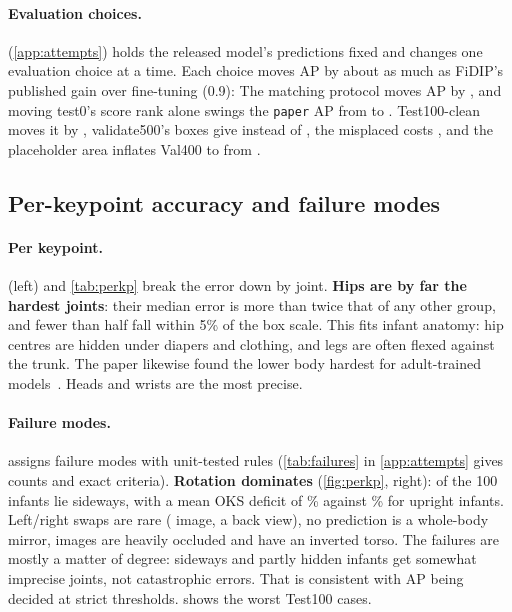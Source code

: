 \paragraph{Evaluation choices.}  (\cref{app:attempts}) holds the released model's predictions fixed and changes one evaluation choice at a time. Each choice moves AP by about as much as FiDIP's published gain over fine-tuning (0.9):
The matching protocol moves AP by , and moving test0's score rank alone swings the \texttt{paper} AP from  to . Test100-clean moves it by , validate500's boxes give  instead of , the misplaced  costs , and the placeholder area inflates Val400 to  from .

\subsection{Per-keypoint accuracy and failure modes}\label{sec:perkp}\label{sec:failures}

\paragraph{Per keypoint.}  (left) and \cref{tab:perkp} break the error down by joint. \textbf{Hips are by far the hardest joints}: their median error is more than twice that of any other group, and fewer than half fall within 5\% of the box scale.
This fits infant anatomy: hip centres are hidden under diapers and clothing, and legs are often flexed against the trunk. The paper likewise found the lower body hardest for adult-trained models~\citep{huang2021fidip}.
Heads and wrists are the most precise.

\paragraph{Failure modes.}  assigns failure modes with unit-tested rules (\cref{tab:failures} in \cref{app:attempts} gives counts and exact criteria).
\textbf{Rotation dominates} (\cref{fig:perkp}, right):  of the 100 infants lie sideways, with a mean OKS deficit of \% against \% for upright infants. Left/right swaps are rare ( image, a back view), no prediction is a whole-body mirror,  images are heavily occluded and  have an inverted torso.
The failures are mostly a matter of degree: sideways and partly hidden infants get somewhat imprecise joints, not catastrophic errors. That is consistent with AP being decided at strict thresholds.
 shows the worst Test100 cases.

